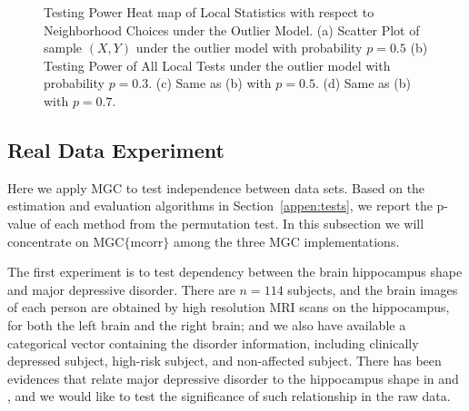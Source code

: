 \documentclass[11pt]{article}
\begin{document}
\begin{figure}[htbp]
{}
\hfil
{}
\caption{Testing Power Heat map of Local Statistics with respect to Neighborhood Choices under the Outlier Model.
(a) Scatter Plot of sample $(X,Y)$ under the outlier model with probability $p=0.5$
(b) Testing Power of All Local Tests under the outlier model with probability $p=0.3$.
(c) Same as (b) with $p=0.5$.
(d) Same as (b) with $p=0.7$.
}
\label{figSim3}
\end{figure}

\subsection{Real Data Experiment}
\label{numer3}
Here we apply MGC to test independence between data sets. Based on the estimation and evaluation algorithms in Section~\ref{appen:tests}, we report the p-value of each method from the permutation test. In this subsection we will concentrate on MGC$\{$mcorr$\}$ among the three MGC implementations.

The first experiment is to test dependency between the brain hippocampus shape and major depressive disorder. There are $n=114$ subjects, and the brain images of each person are obtained by high resolution MRI scans on the hippocampus, for both the left brain and the right brain; and we also have available a categorical vector containing the disorder information, including clinically depressed subject, high-risk subject, and non-affected subject. There has been evidences that relate major depressive disorder to the hippocampus shape in \cite{ParkEtAl2011} and \cite{PosenerEtAl2003}, and we would like to test the significance of such relationship in the raw data. 
\end{document}
